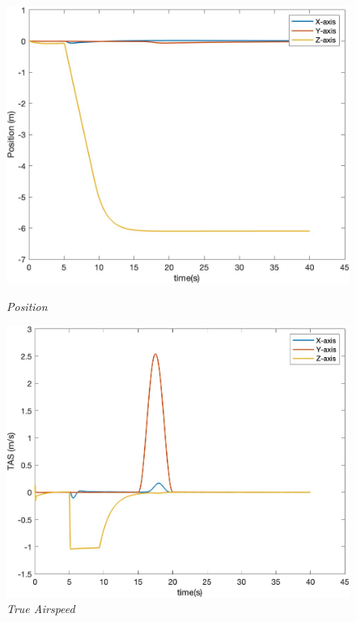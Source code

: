 \begin{figure}[htbp]
  \centering
  \begin{minipage}[b]{0.45\textwidth}
    \centering
    \includegraphics[width=\textwidth]{Images/Gust/VTOL pulse/1 position_5.jpg}
    \caption*{\textit{Position}}
  \end{minipage}
  \hfil
  \begin{minipage}[b]{0.45\textwidth}
    \centering
    \includegraphics[width=\textwidth]{Images/Gust/VTOL pulse/2 airspeed_5.jpg}
    \caption*{\textit{True Airspeed}}
  \end{minipage}
  \begin{minipage}[b]{0.45\textwidth}

\end{minipage}
\end{figure}
